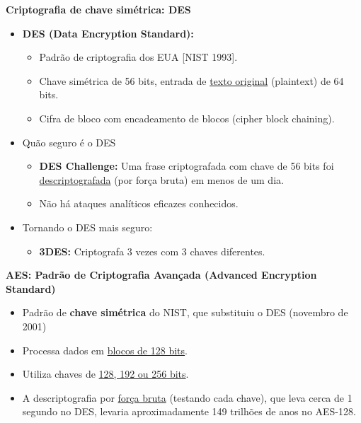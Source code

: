     \textbf{Criptografia de chave simétrica: DES}
    \begin{itemize}[left=0.5cm, align=left, nosep]    
        \item \textbf{DES (Data Encryption Standard):}
        \begin{itemize}[left=0.5cm, nosep, label=$\hookrightarrow$]
            \item Padrão de criptografia dos EUA [NIST 1993].
            \item Chave simétrica de 56 bits, entrada de \underline{texto original} (plaintext) de 64 bits.
            \item Cifra de bloco com encadeamento de blocos (cipher block chaining).
        \end{itemize}     
        
        \item Quão seguro é o DES  
        \begin{itemize}[left=0.5cm, nosep, label=$\hookrightarrow$]
            \item \textbf{DES Challenge:} Uma frase criptografada com chave de 56 bits foi \underline{descriptografada} (por força bruta) em menos de um dia.
            \item Não há ataques analíticos eficazes conhecidos.
        \end{itemize} 
        
        \item Tornando o DES mais seguro:
        \begin{itemize}[left=0.5cm, nosep, label=$\hookrightarrow$]    
            \item \textbf{3DES:} Criptografa 3 vezes com 3 chaves diferentes.
        \end{itemize}
    \end{itemize}  

    \textbf{AES: Padrão de Criptografia Avançada (Advanced Encryption Standard)}
    \begin{itemize}[left=0.5cm, align=left, nosep]    
        \item Padrão de \textbf{chave simétrica} do NIST, que substituiu o DES (novembro de 2001)
        \item Processa dados em \underline{blocos de 128 bits}.
        \item Utiliza chaves de \underline{128, 192 ou 256 bits}.
        \item A descriptografia por \underline{força bruta} (testando cada chave), que leva cerca de 1 segundo no DES, levaria aproximadamente 149 trilhões de anos no AES-128. 
    \end{itemize}  
    
